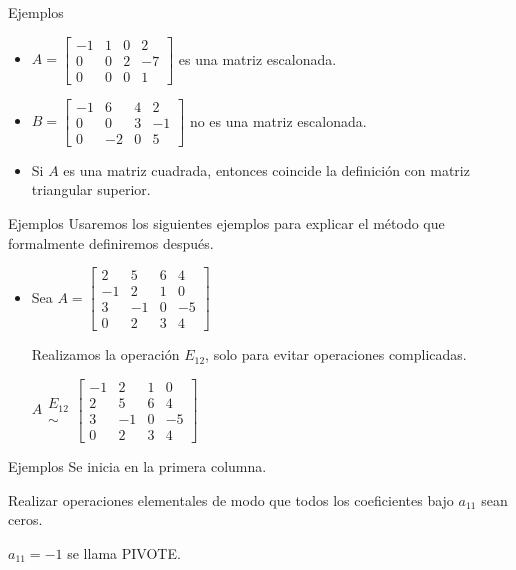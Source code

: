 {Ejemplos}

\begin{itemize}
\item
$A=\begin{bmatrix}
-1 &  1 & 0 &  2\\
0 &  0 & 2 & -7\\
0 &  0 & 0 &  1
\end{bmatrix}$
es una matriz escalonada.

\item
$B=\begin{bmatrix}
-1 &  6 & 4 &  2\\
0 &  0 & 3 & -1\\
0 &  -2 & 0 &  5
\end{bmatrix}$
no es una matriz escalonada.

\item
Si $A$ es una matriz cuadrada, entonces coincide la definición  con matriz triangular superior.
\end{itemize}


{Ejemplos}
Usaremos los siguientes ejemplos para explicar el método que formalmente definiremos después.

\begin{itemize}
\item
Sea
$A=\begin{bmatrix}
2  &  5  & 6  &  4\\
-1 &  2  & 1  &  0\\
3  &  -1 & 0  &  -5\\
0  &   2 & 3  &  4
\end{bmatrix}$

Realizamos la operación $E_{12}$, solo para evitar operaciones complicadas.

$A
\begin{array}{c}
 E_{12}\\
\sim
\end{array}
\begin{bmatrix}
-1 &  2  & 1  &  0\\
2  &  5  & 6  &  4\\
3  &  -1 & 0  &  -5\\
0  &   2 & 3  &  4
\end{bmatrix}
$
\end{itemize}


{Ejemplos}
{Se inicia en la primera columna.}


Realizar operaciones elementales de modo que todos los coeficientes bajo $a_{11}$ sean ceros.


 $a_{11} = -1$ se llama PIVOTE.

